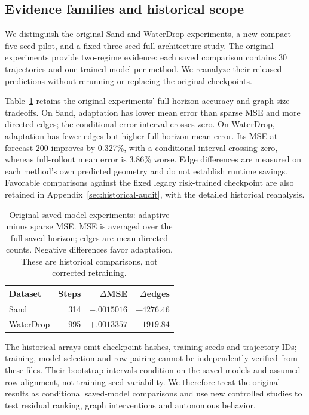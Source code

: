 \subsection{Evidence families and historical scope}
We distinguish the original Sand and WaterDrop experiments, a new compact five-seed pilot, and a fixed three-seed full-architecture study. The original experiments provide two-regime evidence: each saved comparison contains 30 trajectories and one trained model per method. We reanalyze their released predictions without rerunning or replacing the original checkpoints.

Table~\ref{tab:historical-main} retains the original experiments' full-horizon accuracy and graph-size tradeoffs. On Sand, adaptation has lower mean error than sparse MSE and more directed edges; the conditional error interval crosses zero. On WaterDrop, adaptation has fewer edges but higher full-horizon mean error. Its MSE at forecast 200 improves by 0.327\%, with a conditional interval crossing zero, whereas full-rollout mean error is 3.86\% worse. Edge differences are measured on each method's own predicted geometry and do not establish runtime savings. Favorable comparisons against the fixed legacy risk-trained checkpoint are also retained in Appendix~\ref{sec:historical-audit}, with the detailed historical reanalysis.

\begin{table}[t]
\centering\small
\caption{Original saved-model experiments: adaptive minus sparse MSE. MSE is averaged over the full saved horizon; edges are mean directed counts. Negative differences favor adaptation. These are historical comparisons, not corrected retraining.}
\label{tab:historical-main}
\begin{tabular}{lrrr}
\toprule
Dataset & Steps & $\Delta$MSE & $\Delta$edges\\
\midrule
Sand & 314 & $-.0015016$ & $+4276.46$\\
WaterDrop & 995 & $+.0013357$ & $-1919.84$\\
\bottomrule
\end{tabular}
\end{table}

The historical arrays omit checkpoint hashes, training seeds and trajectory IDs; training, model selection and row pairing cannot be independently verified from these files. Their bootstrap intervals condition on the saved models and assumed row alignment, not training-seed variability. We therefore treat the original results as conditional saved-model comparisons and use new controlled studies to test residual ranking, graph interventions and autonomous behavior.

